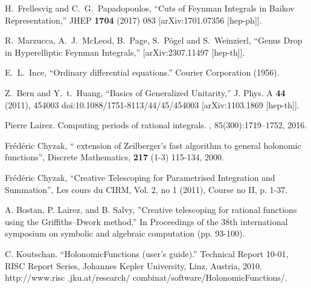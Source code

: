 \documentclass[a4paper,12pt]{article}
\numberwithin{equation}{section}
\numberwithin{figure}{section}
\begin{document}
\begin{thebibliography}{99}
  H.~Frellesvig and C.~G.~Papadopoulos,
  ``Cuts of Feynman Integrals in Baikov Representation,''
  JHEP {\bf 1704} (2017) 083
  [arXiv:1701.07356 [hep-ph]].
  
R.~Marzucca, A.~J.~McLeod, B.~Page, S.~P\"ogel and S.~Weinzierl,
``Genus Drop in Hyperelliptic Feynman Integrals,''
[arXiv:2307.11497 [hep-th]].

 E.~L.~Ince, ``Ordinary differential equations.''
  Courier Corporation  (1956).
 

  
Z.~Bern and Y.~t.~Huang,
``Basics of Generalized Unitarity,''
J. Phys. A \textbf{44} (2011), 454003
doi:10.1088/1751-8113/44/45/454003
[arXiv:1103.1869 [hep-th]].

Pierre Lairez.
\newblock Computing periods of rational integrals.
, 85(300):1719--1752, 2016.
\newblock [arXiv:1404.5069]

  Fr\'ed\'eric Chyzak, `` extension of
    Zeilberger's fast algorithm to general holonomic functions'',
Discrete Mathematics, {\bf 217} (1-3) 115-134, 2000.

 Fr\'ed\'eric Chyzak, ``Creative Telescoping for
  Parametrised Integration and Summation'',  Les cours du CIRM,  Vol. 2, no 1 (2011), Course no II, p. 1-37.

 A. Bostan, P. Lairez, and B. Salvy,
  ''Creative telescoping for rational functions using the
  Griffiths--Dwork method.'' In Proceedings of the 38th international
  symposium on symbolic and algebraic computation (pp. 93-100). 


 C. Koutschan. ``HolonomicFunctions (user's guide).'' Technical Report 10-01, RISC Report Series, Johannes Kepler University, Linz, Austria, 2010. http://www.risc
.jku.at/research/ combinat/software/HolonomicFunctions/.
	
	


\end{thebibliography}
\end{document}
